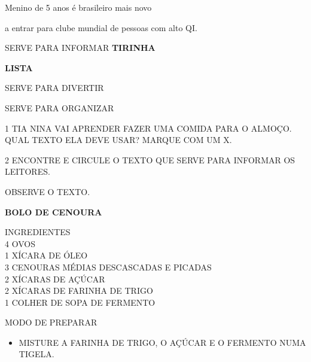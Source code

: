 \begin{escola}
{Menino de 5 anos é brasileiro mais novo

a entrar para clube mundial de pessoas com alto QI.

SERVE PARA INFORMAR \textbf{TIRINHA}

\textbf{LISTA}

SERVE PARA DIVERTIR

SERVE PARA ORGANIZAR
}


\num{1} TIA NINA VAI APRENDER FAZER UMA COMIDA PARA O ALMOÇO. QUAL TEXTO ELA DEVE USAR? MARQUE COM UM X.



\num{2} ENCONTRE E CIRCULE O TEXTO QUE SERVE PARA INFORMAR OS LEITORES.




%

OBSERVE O TEXTO.

\textbf{BOLO DE CENOURA}

INGREDIENTES\\
4 OVOS\\
1 XÍCARA DE ÓLEO\\
3 CENOURAS MÉDIAS DESCASCADAS E PICADAS\\
2 XÍCARAS DE AÇÚCAR\\
2 XÍCARAS DE FARINHA DE TRIGO\\
1 COLHER DE SOPA DE FERMENTO

MODO DE PREPARAR

\begin{itemize}
\item
  MISTURE A FARINHA DE TRIGO, O AÇÚCAR E O FERMENTO NUMA TIGELA.


\end{itemize}
\end{escola}

